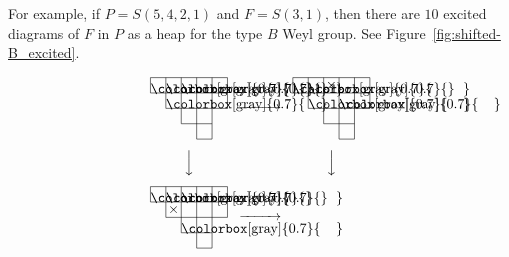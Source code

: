\documentclass[ALCO,ThmDefs,Unicode,epreuves]{cedram}
\begin{document}
\begin{exam}
For example, if $P = S(5,4,2,1)$ and $F = S(3,1)$, 
then there are $10$ excited diagrams of $F$ in $P$ as a heap for the type $B$ Weyl group.
See Figure~\ref{fig:shifted-B_excited}.
\begin{figure}[!htb]
$$
\setlength{\unitlength}{1.1pt}
\begin{CD}
\raisebox{-20pt}{
\begin{picture}(50,40)
\fboxsep=0mm
\put(0,30){\colorbox[gray]{0.7}{\makebox(10,10){}}}
\put(10,30){\colorbox[gray]{0.7}{\makebox(10,10){}}}
\put(20,30){\colorbox[gray]{0.7}{\makebox(10,10){}}}
\put(10,20){\colorbox[gray]{0.7}{\makebox(10,10){}}}
\put(0,40){\line(1,0){50}}
\put(0,30){\line(1,0){50}}
\put(10,20){\line(1,0){40}}
\put(20,10){\line(1,0){20}}
\put(30,0){\line(1,0){10}}
\put(0,30){\line(0,1){10}}
\put(10,20){\line(0,1){20}}
\put(20,10){\line(0,1){30}}
\put(30,0){\line(0,1){40}}
\put(40,0){\line(0,1){40}}
\put(50,20){\line(0,1){20}}
\end{picture}
}
@>>>
\raisebox{-20pt}{
\begin{picture}(50,40)
\fboxsep=0mm
\put(0,30){\colorbox[gray]{0.7}{\makebox(10,10){}}}
\put(10,30){\colorbox[gray]{0.7}{\makebox(10,10){}}}
\put(30,20){\colorbox[gray]{0.7}{\makebox(10,10){}}}
\put(10,20){\colorbox[gray]{0.7}{\makebox(10,10){}}}
\put(0,40){\line(1,0){50}}
\put(0,30){\line(1,0){50}}
\put(10,20){\line(1,0){40}}
\put(20,10){\line(1,0){20}}
\put(30,0){\line(1,0){10}}
\put(0,30){\line(0,1){10}}
\put(10,20){\line(0,1){20}}
\put(20,10){\line(0,1){30}}
\put(30,0){\line(0,1){40}}
\put(40,0){\line(0,1){40}}
\put(50,20){\line(0,1){20}}
\put(20,30){\makebox(10,10){$\times$}}
\end{picture}
}
\\[5pt]
@VVV
@VVV
\\[5pt]
\raisebox{-20pt}{
\begin{picture}(50,40)
\fboxsep=0mm
\put(0,30){\colorbox[gray]{0.7}{\makebox(10,10){}}}
\put(10,30){\colorbox[gray]{0.7}{\makebox(10,10){}}}
\put(20,30){\colorbox[gray]{0.7}{\makebox(10,10){}}}
\put(20,10){\colorbox[gray]{0.7}{\makebox(10,10){}}}
\put(0,40){\line(1,0){50}}
\put(0,30){\line(1,0){50}}
\put(10,20){\line(1,0){40}}
\put(20,10){\line(1,0){20}}
\put(30,0){\line(1,0){10}}
\put(0,30){\line(0,1){10}}
\put(10,20){\line(0,1){20}}
\put(20,10){\line(0,1){30}}
\put(30,0){\line(0,1){40}}
\put(40,0){\line(0,1){40}}
\put(50,20){\line(0,1){20}}
\put(10,20){\makebox(10,10){$\times$}}
\end{picture}
}
@>>>
\raisebox{-20pt}{
\begin{picture}(50,40)
\fboxsep=0mm

\end{picture}}
\end{CD}$$
\end{figure}
\end{exam}
\end{document}
